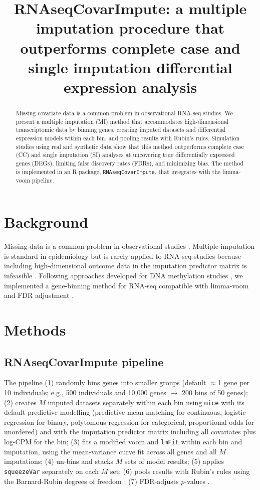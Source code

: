 \documentclass[11pt]{article}
\title{RNAseqCovarImpute: a multiple imputation procedure that outperforms complete case and single imputation differential expression analysis}
\author{}
\date{}
\begin{document}
\maketitle

\begin{abstract}
Missing covariate data is a common problem in observational RNA-seq studies. We present a multiple imputation (MI) method that accommodates high-dimensional transcriptomic data by binning genes, creating imputed datasets and differential expression models within each bin, and pooling results with Rubin's rules. Simulation studies using real and synthetic data show that this method outperforms complete case (CC) and single imputation (SI) analyses at uncovering true differentially expressed genes (DEGs), limiting false discovery rates (FDRs), and minimizing bias. The method is implemented in an R package, \texttt{RNAseqCovarImpute}, that integrates with the limma-voom pipeline.
\end{abstract}

\section{Background}
Missing data is a common problem in observational studies \citep{r1,r2,r3}. Multiple imputation is standard in epidemiology but is rarely applied to RNA-seq studies because including high-dimensional outcome data in the imputation predictor matrix is infeasible \citep{r5,r6,r7}. Following approaches developed for DNA methylation studies \citep{r8,r9}, we implemented a gene-binning method for RNA-seq compatible with limma-voom \citep{r10,r11,r12} and FDR adjustment \citep{r13}.

\section{Methods}
\subsection{RNAseqCovarImpute pipeline}
The pipeline (1) randomly bins genes into smaller groups (default $\approx$1 gene per 10 individuals; e.g., 500 individuals and 10{,}000 genes $\to$ 200 bins of 50 genes); (2) creates $M$ imputed datasets separately within each bin using \texttt{mice} \citep{r14} with its default predictive modelling (predictive mean matching for continuous, logistic regression for binary, polytomous regression for categorical, proportional odds for unordered) and with the imputation predictor matrix including all covariates plus log-CPM for the bin; (3) fits a modified voom and \texttt{lmFit} within each bin and imputation, using the mean-variance curve fit across all genes and all $M$ imputations; (4) un-bins and stacks $M$ sets of model results; (5) applies \texttt{squeezeVar} separately on each $M$ set; (6) pools results with Rubin's rules \citep{r2,r3} using the Barnard-Rubin degrees of freedom \citep{r31}; (7) FDR-adjusts $p$-values \citep{r13}.
\end{document}
